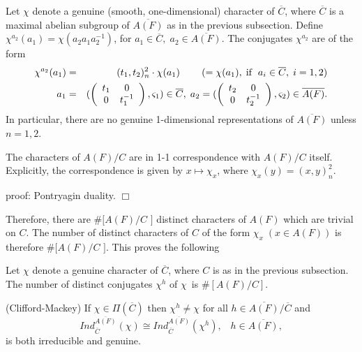 Let $\chi $ denote a genuine (smooth, one-dimensional) character of
$\overline{C}$, where $\overline{C}$ is a maximal abelian subgroup
of $\overline{A(F)}$ as in the previous subsection. Define
$\chi^{a_2}(a_1)=\chi (a_2a_1a_2^{-1})$, for
$a_1\in \overline{C},\;a_2\in \overline{A(F)}$.
The conjugates $\chi ^{a_2}$ are of the form 
\begin{eqnarray}
\chi ^{a_2}(a_1) &=&(t_1,t_2)_n^2\cdot \chi (a_1)\;\;\;\;\;\;\;\;(=\chi
(a_1),\;{\rm if\;}\;a_i\in \overline{C},\;i=1,2)  \nonumber \\
a_1 &=&(\left( 
\begin{array}{cc}
t_1 & 0 \\ 
0 & t_1^{-1}
\end{array}
\right) ,\varsigma _1)\in \overline{C},\;a_2=(\left( 
\begin{array}{cc}
t_2 & 0 \\ 
0 & t_2^{-1}
\end{array}
\right) ,\varsigma _2)\in \overline{A(F)}.
\end{eqnarray}
In particular, there are no genuine 1-dimensional representations of $%
\overline{A(F)}$ unless $n=1,2$.

\begin{lemma}
The characters of $A(F)/C$ are in 1-1 correspondence
with $A(F)/C$ itself. Explicitly, the correspondence is given by
$x\longmapsto \chi _x$, where $\chi _x(y)=(x,y)_n^2$.
\end{lemma}
proof: Pontryagin duality. $\Box$

Therefore, there are $\#[A(F)/C$ $]$ distinct characters of
$A(F)$ which are trivial on $C$. The
number of distinct characters of $C$ of the form $\chi _x\;(x\in A(F))$ is
therefore $\#[A(F)/C$ $]$. This proves the following

\begin{lemma}
Let $\chi $ denote a genuine character of $\overline{C}$, where $C$ is as in
the previous subsection. The number of distinct conjugates $\chi ^h$ of
$\chi $\ is $\#[A(F)/C]$.
\end{lemma}

\begin{lemma}
(Clifford-Mackey) If $\chi \in \Pi (\overline{C})$ then
$\chi ^h\neq \chi $ for all $h\in \overline{A(F)}/\overline{C}$ and 
\[
Ind_{\overline{C}}^{\overline{A(F)}}(\chi )\cong
Ind_{\overline{C}}^{\overline{A(F)}}(\chi ^h),
\;\;\;h\in \overline{A(F)},
\]
is both irreducible and genuine.
\end{lemma}

